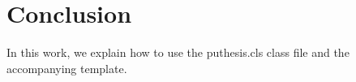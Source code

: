 
\chapter{Conclusion\label{ch:conclusion}}

In this work, we explain how to use the puthesis.cls class file and the accompanying template.  
